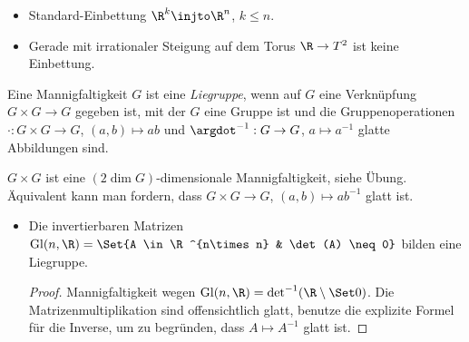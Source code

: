 \begin{ex}
    \begin{itemize}
        \item
            Standard-Einbettung $\R^k \injto \R^n$, $k \le n$.
        \item
            Gerade mit irrationaler Steigung auf dem Torus $\R \to T^2$ ist keine Einbettung.
    \end{itemize}
\end{ex}

\begin{df} \label{2.7}
    Eine Mannigfaltigkeit $G$ ist eine \emph{Liegruppe}, wenn auf $G$ eine Verknüpfung $G \times G \to G$ gegeben ist, mit der $G$ eine Gruppe ist und die Gruppenoperationen $\cdot: G \times G \to G$, $(a,b) \mapsto ab$ und $\argdot^{-1}: G \to G$, $a \mapsto a^{-1}$ glatte Abbildungen sind.
    \begin{note}
        $G \times G$ ist eine $(2 \dim G)$-dimensionale Mannigfaltigkeit, siehe Übung.
        Äquivalent kann man fordern, dass $G\times G \to G$, $(a,b) \mapsto ab^{-1}$ glatt ist.
    \end{note}
\end{df}

\begin{ex}
    \begin{itemize}
        \item
            Die invertierbaren Matrizen
            \begin{math}
                \Gl(n,\R) = \Set{A \in \R^{n\times n} & \det(A) \neq 0}
            \end{math}
            bilden eine Liegruppe.
            \begin{proof}
                Mannigfaltigkeit wegen $\Gl(n,\R) = \det^{-1}(\R \setminus \Set 0)$.
                Die Matrizenmultiplikation sind offensichtlich glatt, benutze die explizite Formel für die Inverse, um zu begründen, dass $A \mapsto A^{-1}$ glatt ist.
            \end{proof}
    \end{itemize}
\end{ex}
